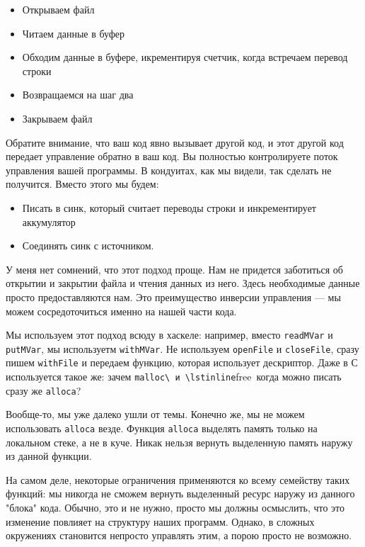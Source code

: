\begin{itemize}  
\item   Открываем файл
\item   Читаем данные в буфер
\item   Обходим данные в буфере, икрементируя счетчик, когда встречаем перевод строки
\item   Возвращаемся на шаг два
\item   Закрываем файл
\end{itemize}
Обратите внимание, что ваш код явно вызывает другой код, и этот другой код 
передает управление обратно в ваш код. Вы полностью контролируете поток 
управления вашей программы. В кондуитах, как мы видели, так сделать 
не получится. Вместо этого мы будем:
\begin{itemize}
\item  Писать в синк, который считает переводы строки и инкрементирует аккумулятор
\item  Соединять синк с источником.
\end{itemize} 
У меня нет сомнений, что этот подход проще. Нам не придется заботиться об 
открытии и закрытии файла и чтения данных из него. Здесь необходимые данные 
просто предоставляются нам. Это преимущество инверсии управления --- мы 
можем сосредоточиться именно на нашей части кода.

Мы используем этот подход всюду в хаскеле: например, вместо \lstinline'readMVar' 
и \lstinline'putMVar', мы используетм \lstinline'withMVar'. Не используем 
\lstinline'openFile' и \lstinline'closeFile', сразу пишем \lstinline'withFile' 
и передаем функцию, которая использует дескриптор. Даже в С используется такое 
же: зачем \lstinline'malloc\ и \lstinline'free\ когда можно писать сразу же \lstinline'alloca'?

Вообще-то, мы уже далеко ушли от темы. Конечно же, мы не можем использовать 
\lstinline'alloca' везде. Функция \lstinline'alloca' выделять память только на 
локальном стеке, а не в куче. Никак нельзя вернуть выделенную память наружу из 
данной функции.

На самом деле, некоторые ограничения применяются ко всему семейству таких 
функций: мы никогда не сможем вернуть выделенный ресурс наружу из данного 
"блока" кода. Обычно, это и не нужно, просто мы должны осмыслить, что это 
изменение повлияет на структуру наших программ. Однако, в сложных окружениях 
становится непросто управлять этим, а порою просто не возможно. 


